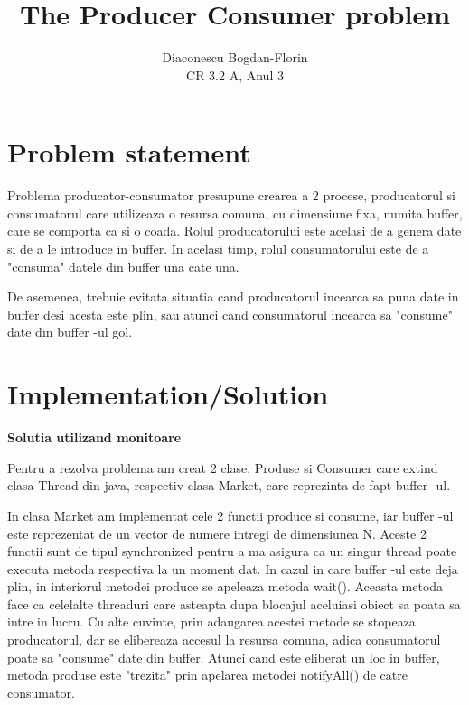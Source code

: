 \documentclass{article}
\title{The Producer Consumer problem}
\author{Diaconescu Bogdan-Florin\\ CR 3.2 A, Anul 3}
\begin{document}
\maketitle
\newpage
\section{Problem statement}
\hspace{0.5 cm}
Problema producator-consumator presupune crearea a 2 procese, producatorul si consumatorul care utilizeaza o resursa comuna, cu dimensiune fixa, numita buffer, care se comporta ca si o coada. Rolul producatorului este acelasi de a genera date si de a le introduce in buffer. In acelasi timp, rolul consumatorului este de a "consuma" datele din buffer una cate una. 

\hspace{0.5 cm}
De asemenea, trebuie evitata situatia cand producatorul incearca sa puna date in buffer desi acesta este plin, sau atunci cand consumatorul incearca sa "consume" date din buffer -ul gol. 

\section{Implementation/Solution}
\hspace{0.5 cm}
{\large \textbf {Solutia utilizand monitoare}}

\vspace{5mm}
\hspace{0.5 cm}
Pentru a rezolva problema am creat 2 clase, Produse si Consumer care extind clasa Thread din java, respectiv clasa Market, care reprezinta de fapt buffer -ul. 

\hspace{0.5 cm}
In clasa Market am implementat cele 2 functii produce si consume, iar buffer -ul este reprezentat de un vector de numere intregi de dimensiunea N. Aceste 2 functii sunt de tipul synchronized pentru a ma asigura ca un singur thread poate executa metoda respectiva la un moment dat. In cazul in care buffer -ul este deja plin, in interiorul metodei produce se apeleaza metoda wait(). Aceasta metoda face ca celelalte threaduri care asteapta dupa blocajul aceluiasi obiect sa poata sa intre in lucru. Cu alte cuvinte, prin adaugarea acestei metode se stopeaza producatorul, dar se elibereaza accesul la resursa comuna, adica consumatorul poate sa "consume" date din buffer. Atunci cand este eliberat un loc in buffer, metoda produse este "trezita" prin apelarea metodei notifyAll() de catre consumator.
\end{document}
